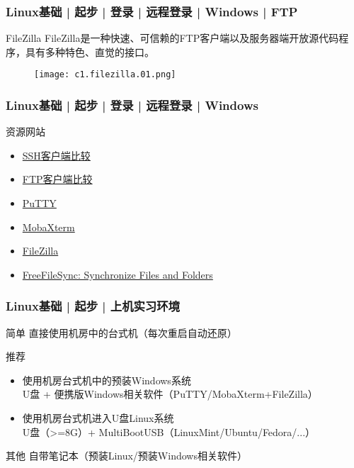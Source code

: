 \begin{frame}
  \frametitle{Linux基础 | 起步 | 登录 | 远程登录 | Windows | FTP}
  \begin{block}{FileZilla}
    FileZilla是一种快速、可信赖的FTP客户端以及服务器端开放源代码程序，具有多种特色、直觉的接口。
  \end{block}
  \begin{figure}
    \centering
    \texttt{[image: c1.filezilla.01.png]}
  \end{figure}
\end{frame}

\begin{frame}
  \frametitle{Linux基础 | 起步 | 登录 | 远程登录 | Windows}
  \begin{block}{资源网站}
    \begin{itemize}
      \item \href{https://www.wikiwand.com/zh-cn/SSH\%E5\%AE\%A2\%E6\%88\%B7\%E7\%AB\%AF\%E6\%AF\%94\%E8\%BE\%83}{SSH客户端比较}
      \item \href{https://www.wikiwand.com/zh-cn/FTP\%E5\%AE\%A2\%E6\%88\%B7\%E7\%AB\%AF\%E6\%AF\%94\%E8\%BE\%83}{FTP客户端比较}
      \item \href{https://www.putty.org/}{PuTTY}
      \item \href{https://mobaxterm.mobatek.net/}{MobaXterm}
      \item \href{https://filezilla-project.org/}{FileZilla}
      \item \href{https://freefilesync.org/}{FreeFileSync: Synchronize Files and Folders}
    \end{itemize}
  \end{block}
\end{frame}

\begin{frame}
  \frametitle{Linux基础 | 起步 | 上机实习环境}
  \begin{block}{简单}
    直接使用机房中的台式机（\alert{每次重启自动还原}）
  \end{block}
  \pause
  \begin{block}{推荐}
    \begin{itemize}
      \item 使用机房台式机中的预装Windows系统\\ \quad U盘 + 便携版Windows相关软件（PuTTY/MobaXterm+FileZilla）
      \item 使用机房台式机进入U盘Linux系统\\ \quad U盘（>=8G）+ MultiBootUSB（LinuxMint/Ubuntu/Fedora/...）
    \end{itemize}
  \end{block}
  \pause
  \begin{block}{其他}
    自带笔记本（预装Linux/预装Windows相关软件）
  \end{block}
\end{frame}

